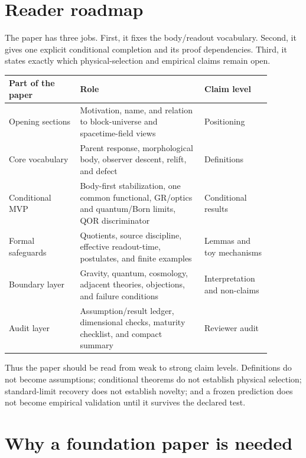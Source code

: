 \documentclass[11pt]{article}
\begin{document}
\section{Reader roadmap}

The paper has three jobs.  First, it fixes the body/readout vocabulary.
Second, it gives one explicit conditional completion and its proof
dependencies.  Third, it states exactly which physical-selection and empirical
claims remain open.

\begin{center}
\begin{tabular}{L{0.24\linewidth}L{0.42\linewidth}L{0.22\linewidth}}
\toprule
Part of the paper & Role & Claim level\\
\midrule
Opening sections & Motivation, name, and relation to block-universe and
spacetime-field views & Positioning\\
Core vocabulary & Parent response, morphological body, observer descent,
relift, and defect & Definitions\\
Conditional MVP & Body-first stabilization, one common functional,
GR/optics and quantum/Born limits, QOR discriminator & Conditional results\\
Formal safeguards & Quotients, source discipline, effective readout-time,
postulates, and finite examples & Lemmas and toy mechanisms\\
Boundary layer & Gravity, quantum, cosmology, adjacent theories, objections,
and failure conditions & Interpretation and non-claims\\
Audit layer & Assumption/result ledger, dimensional checks, maturity checklist,
and compact summary & Reviewer audit\\
\bottomrule
\end{tabular}
\end{center}

Thus the paper should be read from weak to strong claim levels.  Definitions
do not become assumptions; conditional theorems do not establish physical
selection; standard-limit recovery does not establish novelty; and a frozen
prediction does not become empirical validation until it survives the declared
test.

\section{Why a foundation paper is needed}
\end{document}
